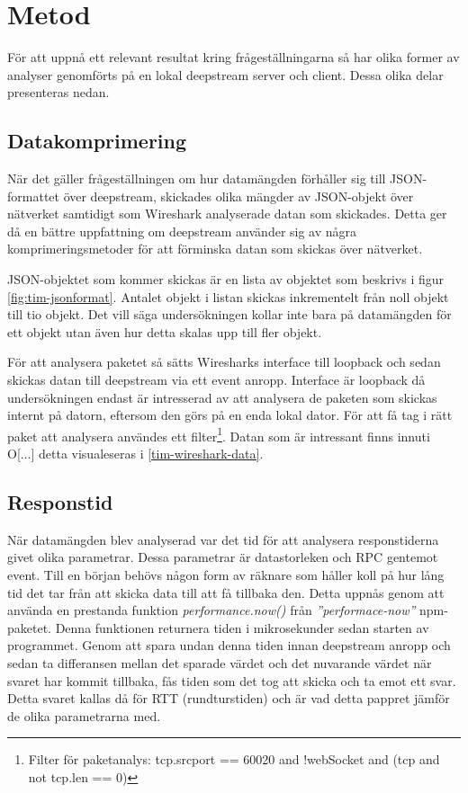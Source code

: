 \section{Metod}
\label{sec:tim-method}
För att uppnå ett relevant resultat kring frågeställningarna så har olika former av analyser genomförts på en lokal deepstream server och client. Dessa olika delar presenteras nedan.

\subsection{Datakomprimering}
\label{subsec:tim-method-datacomp}
När det gäller frågeställningen om hur datamängden förhåller sig till JSON-formattet över deepstream, skickades olika mängder av JSON-objekt över nätverket samtidigt som Wireshark analyserade datan som skickades. Detta ger då en bättre uppfattning om deepstream använder sig av några komprimeringsmetoder för att förminska datan som skickas över nätverket.

JSON-objektet som kommer skickas är en lista av objektet som beskrivs i figur \ref{fig:tim-jsonformat}. Antalet objekt i listan skickas inkrementelt från noll objekt till tio objekt. Det vill säga undersökningen kollar inte bara på datamängden för ett objekt utan även hur detta skalas upp till fler objekt. 

För att analysera paketet så sätts Wiresharks interface till loopback och sedan skickas datan till deepstream via ett event anropp. Interface är loopback då undersökningen endast är intresserad av att analysera de paketen som skickas internt på datorn, eftersom den görs på en enda lokal dator. För att få tag i rätt paket att analysera användes ett filter\footnote{Filter för paketanalys: tcp.srcport == 60020 and !webSocket and (tcp and not tcp.len == 0)}. Datan som är intressant finns innuti O[...] detta visualeseras i \ref{tim-wireshark-data}.

\subsection{Responstid}
\label{subsec:tim-method-response}
När datamängden blev analyserad var det tid för att analysera responstiderna givet olika parametrar. Dessa parametrar är datastorleken och RPC gentemot event. Till en början behövs någon form av räknare som håller koll på hur lång tid det tar från att skicka data till att få tillbaka den. Detta uppnås genom att använda en prestanda funktion \textit{performance.now()} från \textit{''performace-now''}\cite{performance-now} npm-paketet. Denna funktionen returnera tiden i mikrosekunder sedan starten av programmet. Genom att spara undan denna tiden innan deepstream anropp och sedan ta differansen mellan det sparade värdet och det nuvarande värdet när svaret har kommit tillbaka, fås tiden som det tog att skicka och ta emot ett svar. Detta svaret kallas då för RTT (rundturstiden) och är vad detta pappret jämför de olika parametrarna med. 

